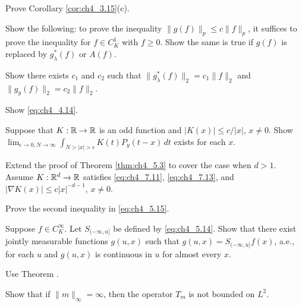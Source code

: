 \begin{exercise}\label{ex:ch4_14}
Prove Corollary \ref{cor:ch4_3.15}(c).
\end{exercise}

\begin{exercise}\label{ex:ch4_15}
Show the following: to prove the inequality $\|g(f)\|_p \leq c\|f\|_p$, it suffices to prove the inequality for $f \in C_K^1$ with $f \geq 0$. Show the same is true if $g(f)$ is replaced by $g_\lambda^*(f)$ or $A(f)$.
\end{exercise}

\begin{exercise}\label{ex:ch4_16}
Show there exists $c_1$ and $c_2$ such that $\|g_\lambda^*(f)\|_2 = c_1\|f\|_2$ and $\|g_y(f)\|_2 = c_2\|f\|_2$.
\end{exercise}

\begin{exercise}\label{ex:ch4_17}
Show \eqref{eq:ch4_4.14}.
\end{exercise}

\mpagebreak

\begin{exercise}\label{ex:ch4_18}
Suppose that $K : \mathbb{R} \to \mathbb{R}$ is an odd function and $|K(x)| \leq c/|x|$, $x \neq 0$. Show $\lim_{\epsilon\to 0,N\to\infty} \int_{N>|x|>\epsilon} K(t)P_y(t-x)\,dt$ exists for each $x$.
\end{exercise}

\begin{exercise}\label{ex:ch4_19}
Extend the proof of Theorem \ref{thm:ch4_5.3} to cover the case when $d > 1$. Assume $K : \mathbb{R}^d \to \mathbb{R}$ satisfies \eqref{eq:ch4_7.11}, \eqref{eq:ch4_7.13}, and $|\nabla K(x)| \leq c|x|^{-d-1}$, $x \neq 0$.
\end{exercise}

\begin{exercise}\label{ex:ch4_20}
Prove the second inequality in \eqref{eq:ch4_5.15}.
\end{exercise}

\begin{exercise}\label{ex:ch4_21}
Suppose $f \in C_K^\infty$. Let $S_{(-\infty,u]}$ be defined by \eqref{eq:ch4_5.14}. Show that there exist jointly measurable functions $g(u,x)$ such that $g(u,x) = S_{(-\infty,u]}f(x)$, a.e., for each $u$ and $g(u,x)$ is continuous in $u$ for almost every $x$.

\hint Use Theorem .
\end{exercise}

\begin{exercise}\label{ex:ch4_22}
Show that if $\|m\|_\infty = \infty$, then the operator $T_m$ is not bounded on $L^2$.
\end{exercise}

